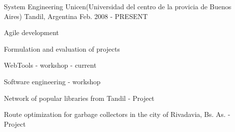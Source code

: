 


\begin{cventries}


\cventry
{System Engineering} %
{Unicen(Universidad del centro de la provicia de Buenos Aires)} %
{Tandil, Argentina} %
{Feb. 2008 - PRESENT} %
{ %
\begin{cvitems}
\item {Agile development}
\item {Formulation and evaluation of projects}
\item {WebTools - workshop - current}
\item {Software engineering - workshop}
\item {Network of popular libraries from Tandil - Project}
\item {Route optimization for garbage collectors in the city of Rivadavia, Bs. As. - Project}
\end{cvitems}
}


\end{cventries}
